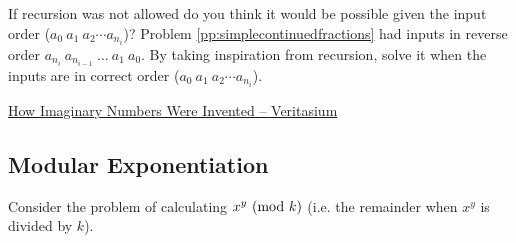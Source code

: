 \begin{noteI}
If recursion was not allowed do you think it would be possible given the input order ($a_0\ a_1\ a_2 \cdots a_{n_i}$)? Problem \ref{pp:simplecontinuedfractions} had inputs in reverse order $a_{n_i}\ a_{n_{i-1}}\ \ldots\ a_1\ a_0$. By taking inspiration from recursion, solve it when the inputs are in correct order ($a_0\ a_1\ a_2 \cdots a_{n_i}$).
\end{noteI}
\begin{funvideo}
\href{https://youtu.be/cUzklzVXJwo}{How Imaginary Numbers Were Invented -- Veritasium}
\end{funvideo}
\recalctypearea
\subsection{Modular Exponentiation}
Consider the problem of calculating $x^y\ (\mathrm{mod}\ k)$ (i.e. the remainder when $x^y$ is divided by $k$).

